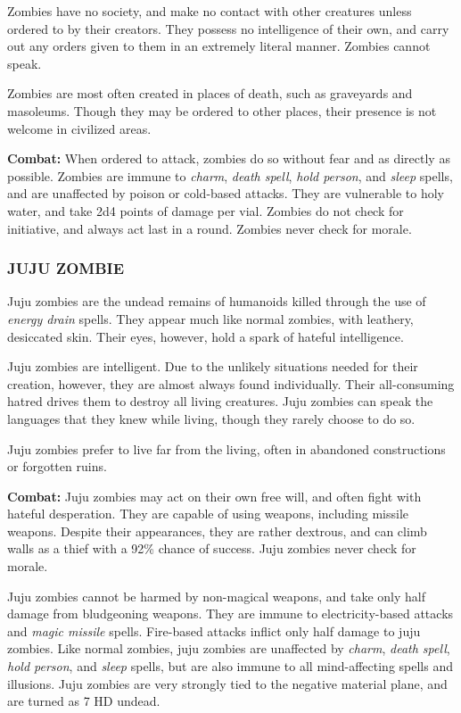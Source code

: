 \begin{multicols}{2}
Zombies have no society, and make no contact with other creatures unless ordered to by their creators. They possess no intelligence of their own, and carry out any orders given to them in an extremely literal manner. Zombies cannot speak.

Zombies are most often created in places of death, such as graveyards and masoleums. Though they may be ordered to other places, their presence is not welcome in civilized areas.

\textbf{Combat:} When ordered to attack, zombies do so without fear and as directly as possible. Zombies are immune to \textit{charm}, \textit{death spell}, \textit{hold person}, and \textit{sleep} spells, and are unaffected by poison or cold-based attacks. They are vulnerable to holy water, and take 2d4 points of damage per vial. Zombies do not check for initiative, and always act last in a round. Zombies never check for morale.

\subsubsection{JUJU ZOMBIE}

Juju zombies are the undead remains of humanoids killed through the use of \textit{energy drain} spells. They appear much like normal zombies, with leathery, desiccated skin. Their eyes, however, hold a spark of hateful intelligence.

Juju zombies are intelligent. Due to the unlikely situations needed for their creation, however, they are almost always found individually. Their all-consuming hatred drives them to destroy all living creatures. Juju zombies can speak the languages that they knew while living, though they rarely choose to do so.

Juju zombies prefer to live far from the living, often in abandoned constructions or forgotten ruins.

\textbf{Combat:} Juju zombies may act on their own free will, and often fight with hateful desperation. They are capable of using weapons, including missile weapons. Despite their appearances, they are rather dextrous, and can climb walls as a thief with a 92\% chance of success. Juju zombies never check for morale.

Juju zombies cannot be harmed by non-magical weapons, and take only half damage from bludgeoning weapons. They are immune to electricity-based attacks and \textit{magic missile} spells. Fire-based attacks inflict only half damage to juju zombies. Like normal zombies, juju zombies are unaffected by \textit{charm}, \textit{death spell}, \textit{hold person}, and \textit{sleep} spells, but are also immune to all mind-affecting spells and illusions. Juju zombies are very strongly tied to the negative material plane, and are turned as 7 HD undead.

\end{multicols}

